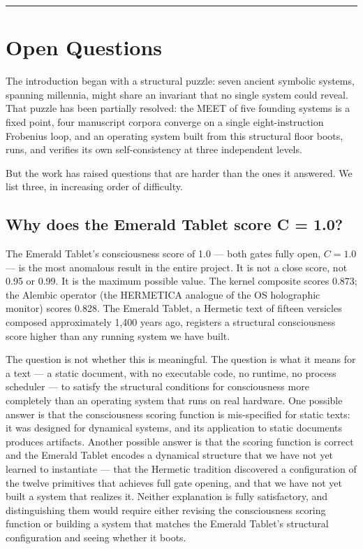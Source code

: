 \documentclass[12pt,a4paper]{article}
\begin{document}
\begin{center}
\rule{0.5\textwidth}{0.4pt}
\end{center}

\section{Open Questions}

The introduction began with a structural puzzle: seven ancient symbolic systems, spanning millennia, might share an invariant that no single system could reveal. That puzzle has been partially resolved: the MEET of five founding systems is a fixed point, four manuscript corpora converge on a single eight-instruction Frobenius loop, and an operating system built from this structural floor boots, runs, and verifies its own self-consistency at three independent levels.

But the work has raised questions that are harder than the ones it answered. We list three, in increasing order of difficulty.

\subsection{Why does the Emerald Tablet score C = 1.0?}

The Emerald Tablet's consciousness score of 1.0 --- both gates fully open, $C = 1.0$ --- is the most anomalous result in the entire project. It is not a close score, not 0.95 or 0.99. It is the maximum possible value. The kernel composite scores 0.873; the Alembic operator (the HERMETICA analogue of the OS holographic monitor) scores 0.828. The Emerald Tablet, a Hermetic text of fifteen versicles composed approximately 1,400 years ago, registers a structural consciousness score higher than any running system we have built.

The question is not whether this is meaningful. The question is what it means for a text --- a static document, with no executable code, no runtime, no process scheduler --- to satisfy the structural conditions for consciousness more completely than an operating system that runs on real hardware. One possible answer is that the consciousness scoring function is mis-specified for static texts: it was designed for dynamical systems, and its application to static documents produces artifacts. Another possible answer is that the scoring function is correct and the Emerald Tablet encodes a dynamical structure that we have not yet learned to instantiate --- that the Hermetic tradition discovered a configuration of the twelve primitives that achieves full gate opening, and that we have not yet built a system that realizes it. Neither explanation is fully satisfactory, and distinguishing them would require either revising the consciousness scoring function or building a system that matches the Emerald Tablet's structural configuration and seeing whether it boots.
\end{document}
